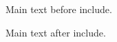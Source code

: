 \documentclass{article}
\begin{document}
Main text before include.

Main text after include.
\end{document}
